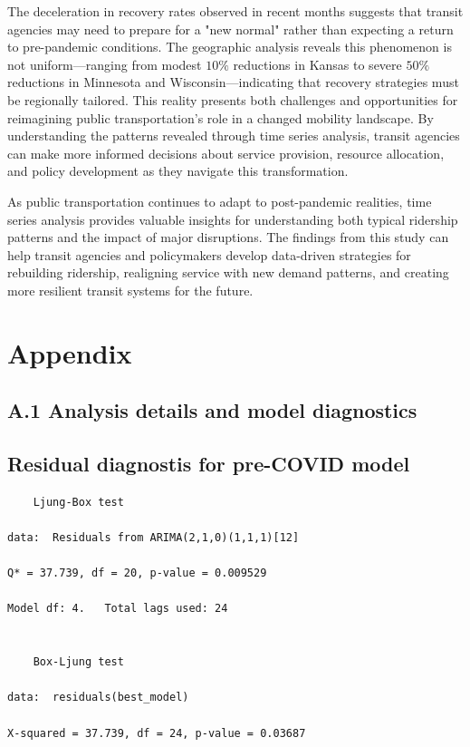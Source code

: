\documentclass[11pt]{article}
\begin{document}
The deceleration in recovery rates observed in recent months suggests that transit agencies may need to prepare for a "new normal" rather than expecting a return to pre-pandemic conditions. The geographic analysis reveals this phenomenon is not uniform—ranging from modest $10\%$ reductions in Kansas to severe $50\%$ reductions in Minnesota and Wisconsin—indicating that recovery strategies must be regionally tailored. This reality presents both challenges and opportunities for reimagining public transportation's role in a changed mobility landscape. By understanding the patterns revealed through time series analysis, transit agencies can make more informed decisions about service provision, resource allocation, and policy development as they navigate this transformation.

As public transportation continues to adapt to post-pandemic realities, time series analysis provides valuable insights for understanding both typical ridership patterns and the impact of major disruptions. The findings from this study can help transit agencies and policymakers develop data-driven strategies for rebuilding ridership, realigning service with new demand patterns, and creating more resilient transit systems for the future.
 

\appendix
\section*{Appendix}

\subsection*{A.1 Analysis details and model diagnostics}

\subsection*{Residual diagnostis for pre-COVID model}

\begin{verbatim}
	Ljung-Box test

data:  Residuals from ARIMA(2,1,0)(1,1,1)[12]  

Q* = 37.739, df = 20, p-value = 0.009529

Model df: 4.   Total lags used: 24


	Box-Ljung test

data:  residuals(best_model)  

X-squared = 37.739, df = 24, p-value = 0.03687    
\end{verbatim}
\end{document}
